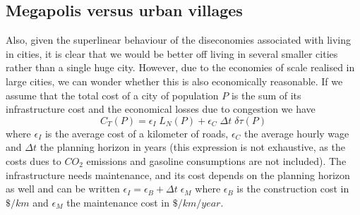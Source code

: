 \subsection{Megapolis versus urban villages} Also, given the superlinear behaviour of the diseconomies associated with living in cities, it is clear that we would be better off living in several smaller cities rather than a single huge city. However, due to the economies of scale realised in large cities, we can wonder whether this is also economically reasonable. If we assume that the total cost of a city of population $P$ is the sum of its infrastructure cost and the economical losses due to congestion we have
%
\begin{equation}
C_T(P) = \epsilon_I \; L_N(P) + \epsilon_C \; \Delta t  \; \delta \tau(P)
\end{equation}
%
where $\epsilon_I$ is the average cost of a kilometer of roads, $\epsilon_C$ the average hourly wage and $\Delta t$ the planning horizon in years (this expression is not exhaustive, as the costs dues to $CO_2$ emissions and gasoline consumptions are not included). The infrastructure needs maintenance, and its cost depends on the planning horizon as well and can be written $\epsilon_I= \epsilon_{B} + \Delta t\; \epsilon_{M}$ where $\epsilon_B$ is the construction cost in $\$/km$ and $\epsilon_M$ the maintenance cost in $ \$/km/year$.

